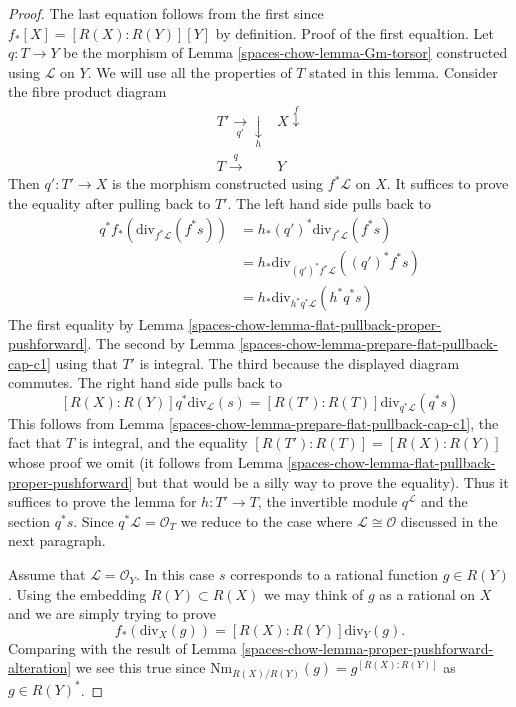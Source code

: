 \begin{proof}
The last equation follows from the first since $f_*[X] = [R(X) : R(Y)][Y]$ by
definition. Proof of the first equaltion. Let $q : T \to Y$ be the morphism of
Lemma \ref{spaces-chow-lemma-Gm-torsor} constructed using $\mathcal{L}$ on $Y$. We will use
all the properties of $T$ stated in this lemma. Consider the fibre product
diagram
$$
\begin{array}{cc}T' \underset{q'}{\longrightarrow}\underset{h}{\downarrow} & X \overset{f}{\downarrow} \\ T \overset{q}{\longrightarrow} & Y\end{array}
$$
Then $q' : T' \to X$ is the morphism constructed using $f^*\mathcal{L}$
on $X$. It suffices to prove the equality after pulling back to $T'$.
The left hand side pulls back to
\begin{align*}
q^*f_*\left(\text{div}_{f^*\mathcal{L}}(f^*s)\right)
& =
h_*(q')^*\text{div}_{f^*\mathcal{L}}(f^*s) \\
& =
h_*\text{div}_{(q')^*f^*\mathcal{L}}((q')^*f^*s) \\
& =
h_*\text{div}_{h^*q^*\mathcal{L}}(h^*q^*s)
\end{align*}
The first equality by Lemma \ref{spaces-chow-lemma-flat-pullback-proper-pushforward}.
The second by Lemma \ref{spaces-chow-lemma-prepare-flat-pullback-cap-c1}
using that $T'$ is integral. The third because the displayed diagram commutes.
The right hand side pulls back to
$$
[R(X) : R(Y)]q^*\text{div}_\mathcal{L}(s) =
[R(T') : R(T)]\text{div}_{q^*\mathcal{L}}(q^*s)
$$
This follows from Lemma \ref{spaces-chow-lemma-prepare-flat-pullback-cap-c1},
the fact that $T$ is integral, and the equality
$[R(T') : R(T)] = [R(X) : R(Y)]$ whose proof we omit
(it follows from Lemma \ref{spaces-chow-lemma-flat-pullback-proper-pushforward}
but that would be a silly way to prove the equality).
Thus it suffices to prove the lemma for $h : T' \to T$, the
invertible module $q^\mathcal{L}$ and the section $q^*s$.
Since $q^*\mathcal{L} = \mathcal{O}_T$
we reduce to the case where $\mathcal{L} \cong \mathcal{O}$
discussed in the next paragraph.

\medskip\noindent
Assume that $\mathcal{L} = \mathcal{O}_Y$. In this case $s$
corresponds to a rational function $g \in R(Y)$. Using the
embedding $R(Y) \subset R(X)$ we may think of $g$ as a rational
on $X$ and we are simply trying to prove
$$
f_*\left(\text{div}_X(g)\right) = [R(X) : R(Y)]\text{div}_Y(g).
$$
Comparing with the result of Lemma \ref{spaces-chow-lemma-proper-pushforward-alteration}
we see this true since $\text{Nm}_{R(X)/R(Y)}(g) = g^{[R(X) : R(Y)]}$
as $g \in R(Y)^*$.
\end{proof}

